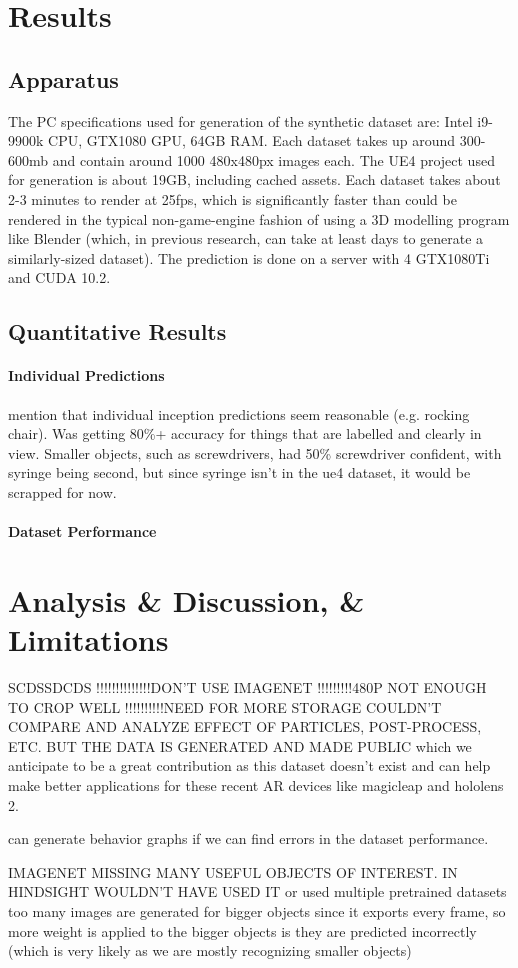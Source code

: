 \section{Results}
\subsection{Apparatus}
The PC specifications used for generation of the synthetic dataset are: Intel i9-9900k CPU, GTX1080 GPU, 64GB RAM. Each dataset takes up around 300-600mb and contain around 1000 480x480px images each. The UE4 project used for generation is about 19GB, including cached assets. Each dataset takes about 2-3 minutes to render at 25fps, which is significantly faster than could be rendered in the typical non-game-engine fashion of using a 3D modelling program like Blender (which, in previous research, can take at least days to generate a similarly-sized dataset). The prediction is done on a server with 4 GTX1080Ti and CUDA 10.2.
\subsection{Quantitative Results}
\paragraph{Individual Predictions} mention that individual inception predictions seem reasonable (e.g. rocking chair). Was getting 80\%+ accuracy for things that are labelled and clearly in view. Smaller objects, such as screwdrivers, had 50\% screwdriver confident, with syringe being second, but since syringe isn't in the ue4 dataset, it would be scrapped for now.
\paragraph{Dataset Performance}
\section{Analysis \& Discussion, \& Limitations}
SCDSSDCDS
!!!!!!!!!!!!!!DON'T USE IMAGENET
!!!!!!!!!480P NOT ENOUGH TO CROP WELL
!!!!!!!!!!NEED FOR MORE STORAGE
COULDN'T COMPARE AND ANALYZE EFFECT OF PARTICLES, POST-PROCESS, ETC. BUT THE DATA IS GENERATED AND MADE PUBLIC which we anticipate to be a great contribution as this dataset doesn't exist and can help make better applications for these recent AR devices like magicleap and hololens 2.  

can generate behavior graphs if we can find errors in the dataset performance.

IMAGENET MISSING MANY USEFUL OBJECTS OF INTEREST. IN HINDSIGHT WOULDN'T HAVE USED IT or used multiple pretrained datasets
too many images are generated for bigger objects since it exports every frame, so more weight is applied to the bigger objects is they are predicted incorrectly (which is very likely as we are mostly recognizing smaller objects)